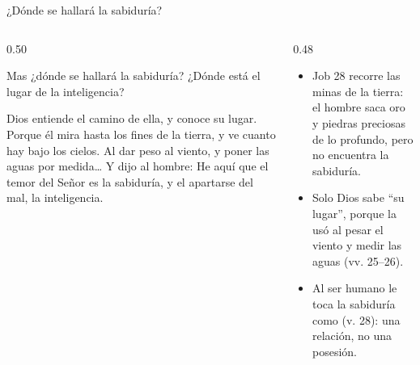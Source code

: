\begin{frame}{¿Dónde se hallará la sabiduría?}
\begin{columns}[t,onlytextwidth]
\begin{column}{0.50\textwidth}
\begin{cita}Mas ¿dónde se hallará la sabiduría? ¿Dónde está el lugar de la inteligencia?\end{cita}
\begin{cita}Dios entiende el camino de ella, y conoce su lugar. Porque él mira hasta los fines de la tierra, y ve cuanto hay bajo los cielos. Al dar peso al viento, y poner las aguas por medida\ldots{} Y dijo al hombre: He aquí que el temor del Señor es la sabiduría, y el apartarse del mal, la inteligencia.\end{cita}
\end{column}
\begin{column}{0.48\textwidth}\small
\begin{itemize}
\item Job 28 recorre las minas de la tierra: el hombre saca oro y piedras preciosas de lo profundo, pero no encuentra la sabiduría.
\item Solo Dios sabe ``su lugar'', porque la usó al pesar el viento y medir las aguas (vv. 25--26).
\item Al ser humano le toca la sabiduría como  (v. 28): una relación, no una posesión.
\end{itemize}
\end{column}
\end{columns}
\end{frame}

